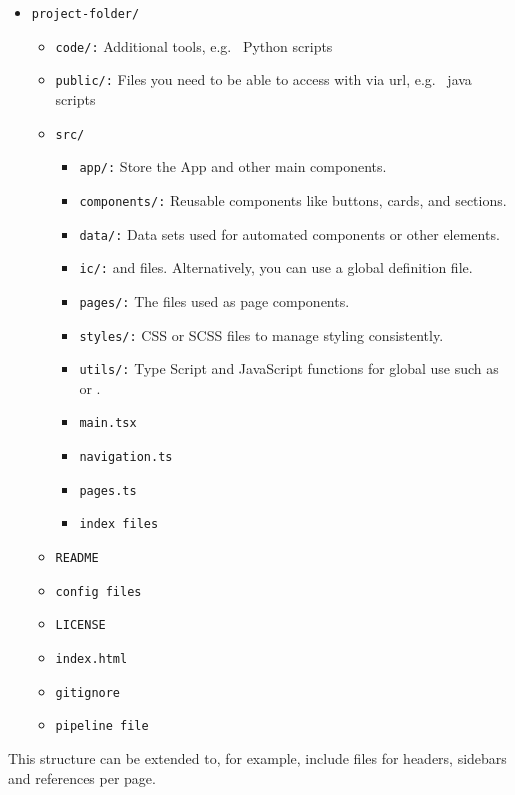 \begin{itemize}
    \item \texttt{project-folder/}
    \begin{itemize}
        \item \texttt{code/:} Additional tools, e.g. \ Python scripts
        \item \texttt{public/:} Files you need to be able to access with via url, e.g. \ java scripts
        \item \texttt{src/}
        \begin{itemize}
            \item \texttt{app/:} Store the App and other main components.
            \item \texttt{components/:} Reusable components like buttons, cards, and sections.
            \item \texttt{data/:} Data sets used for automated components or other elements.
            \item \texttt{ic/:}  and  files.
            Alternatively, you can use a global definition file.
            \item \texttt{pages/:} The files used as page components.
            \item \texttt{styles/:} CSS or SCSS files to manage styling consistently.
            \item \texttt{utils/:} Type Script and JavaScript functions for global use such as  or .
            \item \texttt{main.tsx}
            \item \texttt{navigation.ts}
            \item \texttt{pages.ts}
            \item \texttt{index files}
        \end{itemize}
        \item \texttt{README}
        \item \texttt{config files}
        \item \texttt{LICENSE}
        \item \texttt{index.html}
        \item \texttt{gitignore}
        \item \texttt{pipeline file}
    \end{itemize}
\end{itemize}
This structure can be extended to, for example, include files for headers, sidebars and references per page.

